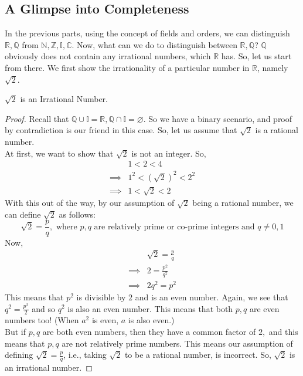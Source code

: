 \subsection{A Glimpse into Completeness}
In the previous parts, using the concept of fields and orders, we can distinguish $\mathbb{R},\mathbb{Q}$ from $\mathbb{N},\mathbb{Z},\mathbb{I},\mathbb{C}$. Now, what can we do to distinguish between $\mathbb{R},\mathbb{Q}$? $\mathbb{Q}$ obviously does not contain any irrational numbers, which $\mathbb{R}$ has. So, let us start from there. We first show the irrationality of a particular number in $\mathbb{R}$, namely $\sqrt{2}$.
\begin{Example}\label{irrationality_of_sqrt2}
    $\sqrt{2}$ is an Irrational Number.
\end{Example}
\begin{proof}
    Recall that $\mathbb{Q}\cup\mathbb{I}=\mathbb{R},\mathbb{Q}\cap\mathbb{I}=\varnothing$. So we have a binary scenario, and proof by contradiction is our friend in this case. So, let us assume that $\sqrt{2}$ is a rational number.\\
    At first, we want to show that $\sqrt{2}$ is not an integer. So,
    \begin{align*}
        & 1<2<4\\
        \implies& 1^2<(\sqrt{2})^2<2^2\\
        \implies& 1<\sqrt{2}<2
    \end{align*}
    With this out of the way, by our assumption of $\sqrt{2}$ being a rational number, we can define $\sqrt{2}$ as follows:
    $$\sqrt{2}=\frac{p}{q},\text{ where $p,q$ are relatively prime or co-prime integers and }q\neq0,1$$
    Now,
    \begin{align*}
       & \sqrt{2}=\frac{p}{q}\\
       \implies & 2 = \frac{p^2}{q^2}\\
       \implies & 2q^2=p^2
    \end{align*}
    This means that $p^2$ is divisible by $2$ and is an even number. Again, we see that $q^2=\frac{p^2}{2}$ and so $q^2$ is also an even number. This means that both $p, q$ are even numbers too! (When $a^2$ is even, $a$ is also even.\footnotemark)\\
    But if $p,q$ are both even numbers, then they have a common factor of $2,$ and this means that $p,q$ are not relatively prime numbers. This means our assumption of defining $\sqrt{2}=\frac{p}{q}$, i.e., taking $\sqrt{2}$ to be a rational number, is incorrect. So, $\sqrt{2}$ is an irrational number.
\end{proof}
